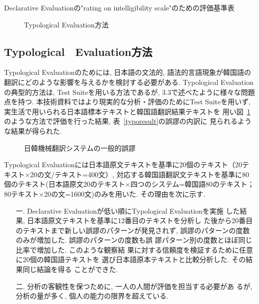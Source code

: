 \begin{table}
\begin{center}
\caption{\label{declcrit}Declarative Evaluationの"rating on intelligibility scale"のための評価基準表}
\end{center}
\end{table}

\begin{figure}
\begin{center}
\caption{\label{typoflow}Typological Evaluation方法}
\end{center}
\end{figure}


\subsection{Typological　Evaluation方法}
Typological Evaluationのためには, 日本語の文法的, 語法的言語現象が韓国語の翻訳にどのような影響を与えるかを検討する必要がある. 
Typological Evaluationの典型的方法は,  Test Suiteを用いる方法であるが, 3.3で述べたように様々な問題点を持つ. 
本技術資料ではより現実的な分析・評価のためにTest Suiteを用いず, 実生活で用いられる日本語標本テキストと韓国語翻訳結果テキストを
用い図~\ref{typoflow}のような方法で評価を行った結果, 表~\ref{typoresult}の誤謬の内訳に
見られるような結果が得られた. 

\begin{figure}
\begin{center}
\caption{\label{jkmtconf}日韓機械翻訳システムの一般的誤謬}
\end{center}
\end{figure}

Typological Evaluationには日本語原文テキストを基準に20個のテキスト（20テキスト×20の文/テキスト=400文）, 
対応する韓国語翻訳文テキストを基準に80個のテキスト(日本語原文20のテキスト×四つのシステム=韓国語80のテキスト；
80テキスト×20の文=1600文)のみを用いた. その理由を次に示す. 

\newpage

\begin{itemize}
 \item[一.] Declarative Evaluationが低い順にTypological Evaluationを実施
	    した結果, 日本語原文テキストを基準に12番目のテキストを分析し
	    た後から20番目のテキストまで新しい誤謬のパターンが発見されず, 
	    誤謬のパターンの度数のみが増加した. 誤謬のパターンの度数も誤
	    謬パターン別の度数とほぼ同じ比率で増加した. このような観察結
	    果に対する信頼度を検証するために任意に20個の韓国語テキストを
	    選び日本語原本テキストと比較分析した. その結果同じ結論を得る
	    ことができた. 
 \item[二.] 分析の客観性を保つために, 一人の人間が評価を担当する必要があ
	    るが, 分析の量が多く, 個人の能力の限界を超えている. 
\end{itemize}

